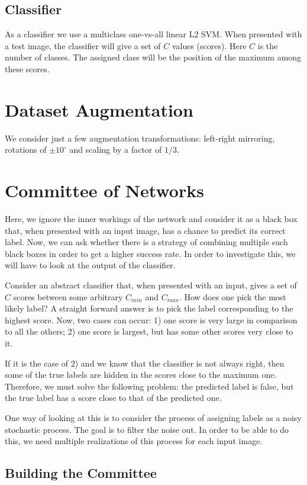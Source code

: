 \documentclass[runningheads]{llncs}
\begin{document}
\subsection{Classifier}
As a classifier we use a multiclass one-vs-all linear L2 SVM.
When presented with a test image, the classifier will give a set of $C$ values (scores). Here $C$ is the number of classes. The assigned class will be the position of the maximum among these scores.

\section{Dataset Augmentation}
We consider just a few augmentation transformations: left-right mirroring, rotations of $\pm 10^{\circ}$ and scaling by a factor of $1/3$.

\section{Committee of Networks}
Here, we ignore the inner workings of the network and consider it as a black box that, when presented with an input image, has a chance to predict its correct label.
Now, we can ask whether there is a strategy of combining multiple such black boxes in order to get a higher success rate. In order to investigate this, we will have to look at the output of the classifier.

Consider an abstract classifier that, when presented with an input, gives a set of $C$ scores between some arbitrary $C_{min}$ and $C_{max}$. How does one pick the most likely label? A straight forward answer is to pick the label corresponding to the highest score. Now, two cases can occur:
1) one score is very large in comparison to all the others; 2) one score is largest, but has some other scores very close to it.

If it is the case of 2) and we know that the classifier is not always right, then some of the true labels are hidden in the scores close to the maximum one.
Therefore, we must solve the following problem: the predicted label is false, but the true label has a score close to that of the predicted one.

One way of looking at this is to consider the process of assigning labels as a noisy stochastic process. The goal is to filter the noise out. In order to be able to do this, we need multiple realizations of this process for each input image.

\subsection{Building the Committee}
\end{document}

